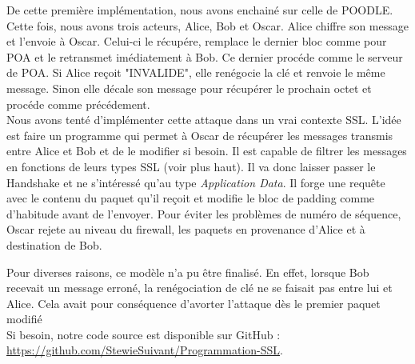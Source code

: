 De cette première implémentation, nous avons enchainé sur celle de POODLE. Cette fois, nous avons trois acteurs,
Alice, Bob et Oscar. Alice chiffre son message et l'envoie à Oscar. Celui-ci le récupére, remplace le dernier bloc
comme pour POA et le retransmet imédiatement à Bob. Ce dernier procéde comme le serveur de POA. Si Alice reçoit
"INVALIDE", elle renégocie la clé et renvoie le même message. Sinon elle décale son message pour récupérer le 
prochain octet et procéde comme précédement.\\

Nous avons tenté d'implémenter cette attaque dans un vrai contexte SSL. L'idée est faire un programme qui permet à
Oscar de récupérer les messages transmis entre Alice et Bob et de le modifier si besoin. Il est capable de filtrer
les messages en fonctions de leurs types SSL (voir plus haut). Il va donc laisser passer le Handshake et ne s'intéressé qu'au type \emph{Application Data}. Il forge une requête avec le contenu du paquet qu'il reçoit et modifie le
bloc de padding comme d'habitude avant de l'envoyer. Pour éviter les problèmes de numéro de séquence, Oscar rejete 
au niveau du firewall, les paquets en provenance d'Alice et à destination de Bob.

Pour diverses raisons, ce modèle n'a pu être finalisé. En effet, lorsque Bob recevait un message erroné,
la renégociation de clé ne se faisait pas entre lui et Alice. Cela avait pour conséquence d'avorter l'attaque
dès le premier paquet modifié\\

Si besoin, notre code source est disponible sur GitHub : \url{https://github.com/StewieSuivant/Programmation-SSL}.
